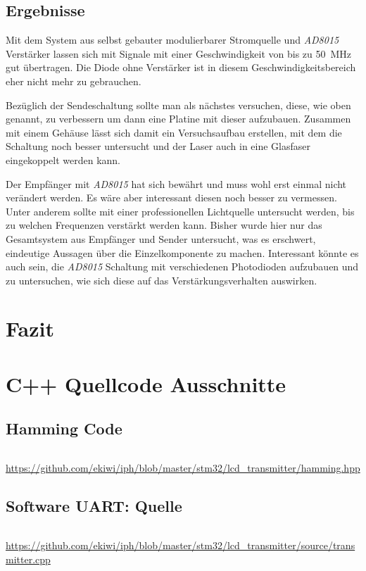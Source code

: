 \documentclass[12pt,a4paper]{article}
\begin{document}
\subsection{Ergebnisse}
Mit dem System aus selbst gebauter modulierbarer Stromquelle und \textit{AD8015} Verstärker lassen sich mit Signale mit einer Geschwindigkeit von bis zu \SI{50}{\mega\hertz} gut übertragen. Die Diode ohne Verstärker ist in diesem Geschwindigkeitsbereich eher nicht mehr zu gebrauchen.

Bezüglich der Sendeschaltung sollte man als nächstes versuchen, diese, wie oben genannt, zu verbessern um dann eine Platine mit dieser aufzubauen. Zusammen mit einem Gehäuse lässt sich damit ein Versuchsaufbau erstellen, mit dem die Schaltung noch besser untersucht und der Laser auch in eine Glasfaser eingekoppelt werden kann.

Der Empfänger mit \textit{AD8015} hat sich bewährt und muss wohl erst einmal nicht verändert werden. Es wäre aber interessant diesen noch besser zu vermessen. Unter anderem sollte mit einer professionellen Lichtquelle untersucht werden, bis zu welchen Frequenzen verstärkt werden kann. Bisher wurde hier nur das Gesamtsystem aus Empfänger und Sender untersucht, was es erschwert, eindeutige Aussagen über die Einzelkomponente zu machen. Interessant könnte es auch sein, die \textit{AD8015} Schaltung mit verschiedenen Photodioden aufzubauen und zu untersuchen, wie sich diese auf das Verstärkungsverhalten auswirken.

\section{Fazit}


\appendix
\section{C++ Quellcode Ausschnitte}
\label{app:code}

\subsection{Hamming Code}
\label{app:code_hamming}
\inputminted[label=hamming.hpp,linenos,tabsize=4,fontsize=\normalsize,frame=lines,rulecolor=\color{gray!70},framerule=1pt]{c++}{../stm32/lcd_transmitter/hamming.hpp}
\url{https://github.com/ekiwi/iph/blob/master/stm32/lcd\_transmitter/hamming.hpp}

\subsection{Software UART: Quelle}
\inputminted[label=transmitter.cpp,linenos,tabsize=4,fontsize=\normalsize,frame=lines,rulecolor=\color{gray!70},framerule=1pt]{c++}{../stm32/lcd_transmitter/source/transmitter.cpp}
\url{https://github.com/ekiwi/iph/blob/master/stm32/lcd\_transmitter/source/transmitter.cpp}
\end{document}
